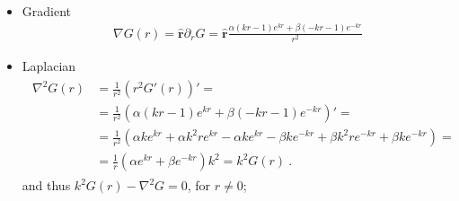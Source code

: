 \documentclass[letterpaper,10pt,italian]{jupyterBook}
\begin{document}
\begin{itemize}
\item {} 
\sphinxAtStartPar
Gradient
\begin{equation*}
\begin{split}\nabla G(r) = \hat{\mathbf{r}} \partial_r G = \hat{\mathbf{r}} \frac{\alpha (k r - 1) e^{kr} + \beta(-k r - 1)e^{-kr}}{r^2}\end{split}
\end{equation*}
\item {} 
\sphinxAtStartPar
Laplacian
\begin{equation*}
\begin{split}\begin{aligned}
    \nabla^2 G(r) & = \frac{1}{r^2} \left( r^2 G'(r) \right)' = \\
    & = \frac{1}{r^2} \left(  \alpha (k r - 1) e^{kr} + \beta(-k r - 1)e^{-kr}\right)' = \\
    & = \frac{1}{r^2} \left( \alpha k e^{kr} + \alpha k^2 r  e^{kr} - \alpha k e^{kr} - \beta k e^{-kr} + \beta k^2 r e^{-kr} + \beta k e^{-kr}  \right) = \\
    & = \frac{1}{r} \left( \alpha e^{kr} + \beta e^{-kr} \right) k^2 = k^2 G(r) \ .
  \end{aligned}\end{split}
\end{equation*}
\sphinxAtStartPar
and thus \(k^2 G(r) - \nabla^2 G = 0\), for \(r \ne 0\);


\end{itemize}
\end{document}
